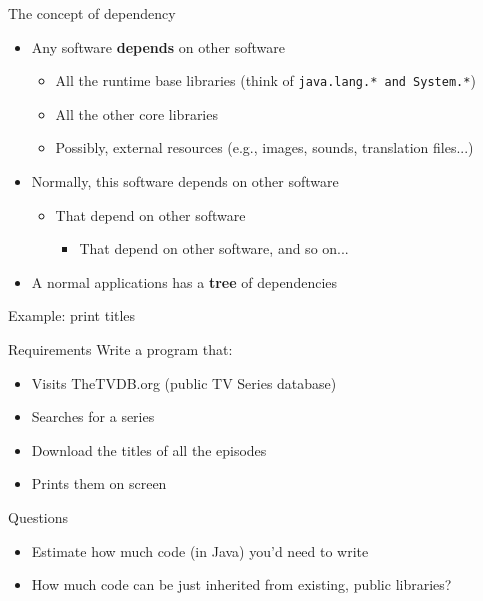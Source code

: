 \documentclass[presentation]{beamer}
\begin{document}
\begin{frame}[fragile]{The concept of dependency}
  \begin{itemize}
    \item Any software \textbf{depends} on other software
    \begin{itemize}
      \item All the runtime base libraries (think of \texttt{java.lang.* and System.*})
      \item All the other core libraries
      \item Possibly, external resources (e.g., images, sounds, translation files...)
    \end{itemize}
   \item Normally, this software depends on other software
    \begin{itemize}
      \item That depend on other software
		\begin{itemize}
			\item That depend on other software, and so on...
		\end{itemize}
    \end{itemize}
   \item A normal applications has a \textbf{tree} of dependencies
  \end{itemize}
\end{frame}

\begin{frame}[fragile]{Example: print titles}
	\begin{block}{Requirements}
		Write a program that:
		\begin{itemize}
			\item Visits TheTVDB.org (public TV Series database)
			\item Searches for a series
			\item Download the titles of all the episodes
			\item Prints them on screen
		\end{itemize}
	\end{block}
	\begin{block}{Questions}
		\begin{itemize}
			\item Estimate how much code (in Java) you'd need to write
			\item How much code can be just inherited from existing, public libraries?
		\end{itemize}
	\end{block}
\end{frame}
\end{document}
